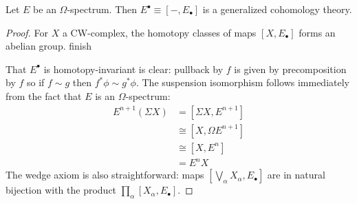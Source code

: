 \documentclass{amsart}
\begin{document}
\begin{proposition}
    Let $E$ be an $\Omega$-spectrum. Then $E^\bullet \equiv [-, E_\bullet]$ is a generalized cohomology theory.
\end{proposition}
\begin{proof}
    For $X$ a CW-complex, the homotopy classes of maps $[X,E_\bullet]$ forms an abelian group. {\color{red} finish}

    That $E^\bullet$ is homotopy-invariant is clear: pullback by $f$ is given by precomposition by $f$ so if
    $f\sim g$ then $f^*\phi\sim g^*\phi$. The suspension isomorphism follows immediately from the fact that
    $E$ is an $\Omega$-spectrum:
    \begin{align*}
        E^{n+1}(\Sigma X) &= [\Sigma X, E^{n+1}]\\
        &\cong [X, \Omega E^{n+1}]\\
        &\cong [X, E^n]\\
        &= E^nX
    \end{align*}
    The wedge axiom is also straightforward: maps $[\bigvee_\alpha X_\alpha, E_\bullet]$ are in natural bijection
    with the product $\prod_\alpha[X_\alpha, E_\bullet]$.
\end{proof}

\end{document}
